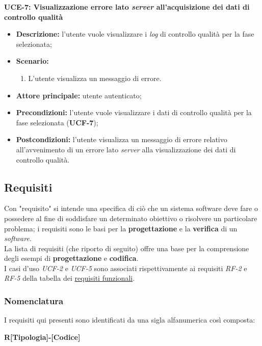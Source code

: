         \textbf{UCE-7: Visualizzazione errore lato \textit{server} all’acquisizione dei dati di controllo qualità}
        \begin{itemize}
            \item \textbf{Descrizione:} l’utente vuole visualizzare i \textit{log} di controllo qualità per la fase selezionata;
            \item \textbf{Scenario:}
                \begin{enumerate}
                    \item L’utente visualizza un messaggio di errore.
                \end{enumerate}
            \item \textbf{Attore principale:} utente autenticato;
            \item \textbf{Precondizioni:} l’utente vuole visualizzare i dati di controllo qualità per la fase selezionata (\textbf{UCF-7});
            \item \textbf{Postcondizioni:} l’utente visualizza un messaggio di errore relativo all’avvenimento di un errore lato \textit{server} alla visualizzazione dei dati di controllo qualità.
        \end{itemize}

\subsection{Requisiti}
\label{subsec:requisiti}

Con "requisito" si intende una specifica di ciò che un sistema software deve fare o possedere al fine di soddisfare un determinato obiettivo o risolvere un particolare problema; i requisiti sono le basi per la \textbf{progettazione} e la \textbf{verifica} di un \textit{software}. \\
La lista di requisiti (che riporto di seguito) offre una base per la comprensione degli esempi di \textbf{progettazione} e \textbf{codifica}. \\
I casi d'uso \textit{UCF-2} e \textit{UCF-5} sono associati rispettivamente ai requisiti \textit{RF-2} e \textit{RF-5} della tabella dei \hyperref[tab:requisiti-funzionali]{requisiti funzionali}.
\subsubsection*{Nomenclatura}

I requisiti qui presenti sono identificati da una sigla alfanumerica così composta:
\begin{center}
    \textbf{R[Tipologia]-[Codice]}
\end{center}

